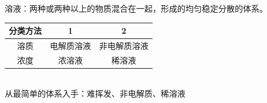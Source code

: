 \documentclass[12pt, a4paper, oneside]{ctexbook}
\begin{document}
溶液：两种或两种以上的物质混合在一起，形成的均匀稳定分散的体系。
\begin{table}[htbp]
    \centering
    \begin{tabular}{|c|c|c|}
        \hline
         分类方法 & 1 & 2\\
        \hline
        溶质 & 电解质溶液 & 非电解质溶液\\
        \hline
        浓度 & 浓溶液 & 稀溶液\\
        \hline
    \end{tabular}
\end{table}
\\从最简单的体系入手：难挥发、非电解质、稀溶液
\end{document}
